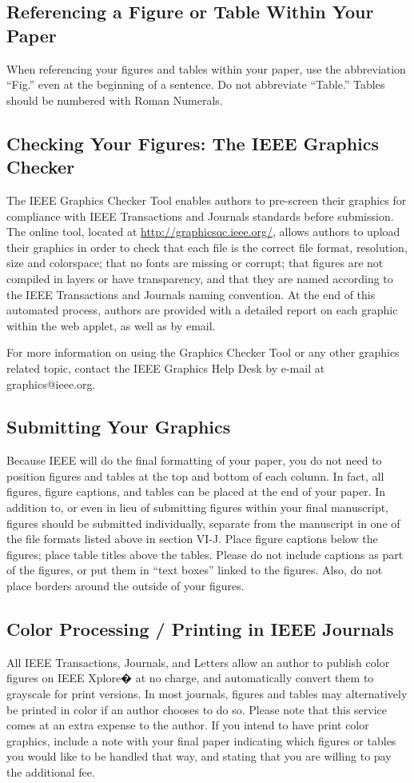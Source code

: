 \documentclass[journal]{IEEEtranTICPS}
\begin{document}
\subsection{Referencing a Figure or Table Within Your Paper}
When referencing your figures and tables within your paper, use the abbreviation ``Fig.'' even at the beginning of a sentence. Do not abbreviate ``Table.'' Tables should be numbered with Roman Numerals.

\subsection{Checking Your Figures: The IEEE Graphics Checker}
The IEEE Graphics Checker Tool enables authors to pre-screen their graphics for compliance with IEEE Transactions and Journals standards before submission. The online tool, located at \url{http://graphicsqc.ieee.org/}, allows authors to upload their graphics in order to check that each file is the correct file format, resolution, size and colorspace; that no fonts are missing or corrupt; that figures are not compiled in layers or have transparency, and that they are named according to the IEEE Transactions and Journals naming convention. At the end of this automated process, authors are provided with a detailed report on each graphic within the web applet, as well as by email.

For more information on using the Graphics Checker Tool or any other graphics related topic, contact the IEEE Graphics Help Desk by e-mail at graphics@ieee.org.

\subsection{Submitting Your Graphics}
Because IEEE will do the final formatting of your paper, you do not need to position figures and tables at the top and bottom of each column. In fact, all figures, figure captions, and tables can be placed at the end of your paper. In addition to, or even in lieu of submitting figures within your final manuscript, figures should be submitted individually, separate from the manuscript in one of the file formats listed above in section VI-J. Place figure captions below the figures; place table titles above the tables. Please do not include captions as part of the figures, or put them in ``text boxes'' linked to the figures. Also, do not place borders around the outside of your figures.

\subsection{Color Processing / Printing in IEEE Journals}
All IEEE Transactions, Journals, and Letters allow an author to publish color figures on IEEE Xplore� at no charge, and automatically convert them to grayscale for print versions. In most journals, figures and tables may alternatively be printed in color if an author chooses to do so. Please note that this service comes at an extra expense to the author. If you intend to have print color graphics, include a note with your final paper indicating which figures or tables you would like to be handled that way, and stating that you are willing to pay the additional fee.
\end{document}
